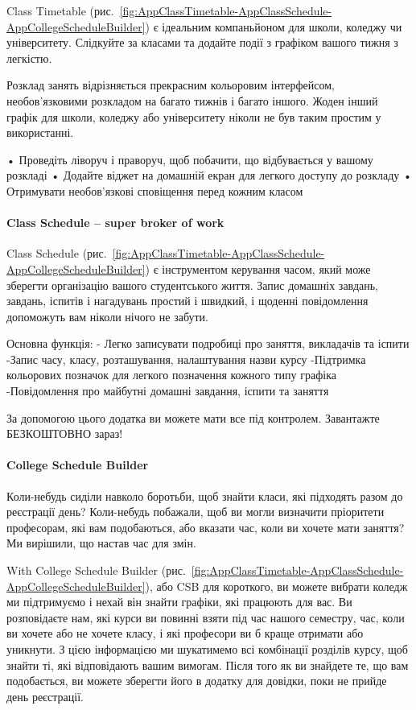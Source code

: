 Class Timetable (рис.~\ref{fig:AppClassTimetable-AppClassSchedule-AppCollegeScheduleBuilder}) є ідеальним компаньйоном для школи, коледжу чи університету. Слідкуйте за класами та додайте події з графіком вашого тижня з легкістю.

Розклад занять відрізняється прекрасним кольоровим інтерфейсом, необов'язковими розкладом на багато тижнів і багато іншого. Жоден інший графік для школи, коледжу або університету ніколи не був таким простим у використанні.

• Проведіть ліворуч і праворуч, щоб побачити, що відбувається у вашому розкладі
• Додайте віджет на домашній екран для легкого доступу до розкладу
• Отримувати необов'язкові сповіщення перед кожним класом

\paragraph{Class Schedule – super broker of work}

Class Schedule (рис.~\ref{fig:AppClassTimetable-AppClassSchedule-AppCollegeScheduleBuilder}) є інструментом керування часом, який може зберегти організацію вашого студентського життя. Запис домашніх завдань, завдань, іспитів і нагадувань простий і швидкий, і щоденні повідомлення допоможуть вам ніколи нічого не забути.

Основна функція:
- Легко записувати подробиці про заняття, викладачів та іспити
-Запис часу, класу, розташування, налаштування назви курсу
-Підтримка кольорових позначок для легкого позначення кожного типу графіка
-Повідомлення про майбутні домашні завдання, іспити та заняття

За допомогою цього додатка ви можете мати все під контролем. Завантажте БЕЗКОШТОВНО зараз!

\paragraph{College Schedule Builder}

Коли-небудь сиділи навколо боротьби, щоб знайти класи, які підходять разом до реєстрації день? Коли-небудь побажали, щоб ви могли визначити пріоритети професорам, які вам подобаються, або вказати час, коли ви хочете мати заняття? Ми вирішили, що настав час для змін.

With College Schedule Builder (рис.~\ref{fig:AppClassTimetable-AppClassSchedule-AppCollegeScheduleBuilder}), або CSB для короткого, ви можете вибрати коледж ми підтримуємо і нехай він знайти графіки, які працюють для вас. Ви розповідаєте нам, які курси ви повинні взяти під час нашого семестру, час, коли ви хочете або не хочете класу, і які професори ви б краще отримати або уникнути. З цією інформацією ми шукатимемо всі комбінації розділів курсу, щоб знайти ті, які відповідають вашим вимогам. Після того як ви знайдете те, що вам подобається, ви можете зберегти його в додатку для довідки, поки не прийде день реєстрації.

